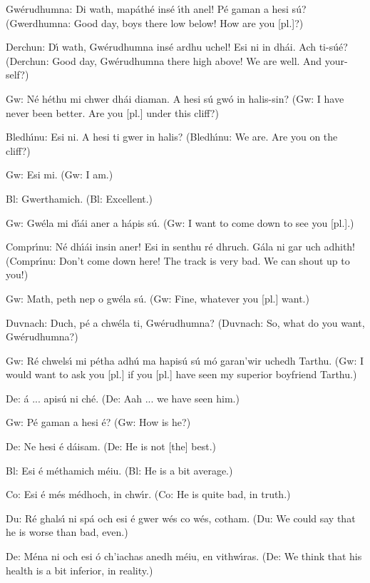 Gw\'{e}rudhumna: Di wath, map\'{a}th\'{e} ins\'{e} \'{\i}th anel! P\'{e} gaman a hesi s\'{u}?
(Gwerdhumna: Good day, boys there low below! How are you [pl.]?)

Derchun: D\'{\i} wath, Gw\'{e}rudhumna ins\'{e} ardhu uchel! Esi ni in dh\'{a}i. Ach ti-s\'{u}\'{e}?
(Derchun: Good day, Gw\'{e}rudhumna there high above! We are well. And your-self?)

Gw: N\'{e} h\'{e}thu mi chwer dh\'{a}i diaman. A hesi s\'{u} gw\'{o} in halis-sin?
(Gw: I have never been better. Are you [pl.] under this cliff?)

Bledh\'{\i}nu: Esi ni. A hesi ti gwer in halis?
(Bledh\'{\i}nu: We are. Are you on the cliff?)

Gw: Esi mi.
(Gw: I am.)

Bl: Gwerthamich.
(Bl: Excellent.)

Gw: Gw\'{e}la mi d\'{\i}\'{a}i aner a h\'{a}pis s\'{u}.
(Gw: I want to come down to see you [pl.].)

Compr\'{\i}nu: N\'{e} dh\'{\i}\'{a}i insin aner! Esi in senthu r\'{e} dhruch. G\'{a}la ni gar uch adhith!
(Compr\'{\i}nu: Don't come down here! The track is very bad. We can shout up to you!)

Gw: Math, peth nep o gw\'{e}la s\'{u}.
(Gw: Fine, whatever you [pl.] want.)

Duvnach: Duch, p\'{e} a chw\'{e}la ti, Gw\'{e}rudhumna?
(Duvnach: So, what do you want, Gw\'{e}rudhumna?)

Gw: R\'{e} chwels\'{\i} mi p\'{e}tha adh\'{u} ma hapis\'{u} s\'{u} m\'{o} garan’wir uchedh Tarthu.
(Gw: I would want to ask you [pl.] if you [pl.] have seen my superior boyfriend Tarthu.)

De: \'{a} ... apis\'{u} ni ch\'{e}.
(De: Aah ... we have seen him.)

Gw: P\'{e} gaman a hesi \'{e}?
(Gw: How is he?)

De: Ne hesi \'{e} d\'{a}isam.
(De: He is not [the] best.)

Bl: Esi \'{e} m\'{e}thamich m\'{e}iu.
(Bl: He is a bit average.)

Co: Esi \'{e} m\'{e}s m\'{e}dhoch, in chw\'{\i}r.
(Co: He is quite bad, in truth.)

Du: R\'{e} ghals\'{\i} ni sp\'{a} och esi \'{e} gwer w\'{e}s co w\'{e}s, cotham.
(Du: We could say that he is worse than bad, even.)

De: M\'{e}na ni och esi \'{o} ch’iachas anedh m\'{e}iu, en vithw\'{\i}ras.
(De: We think that his health is a bit inferior, in reality.)

